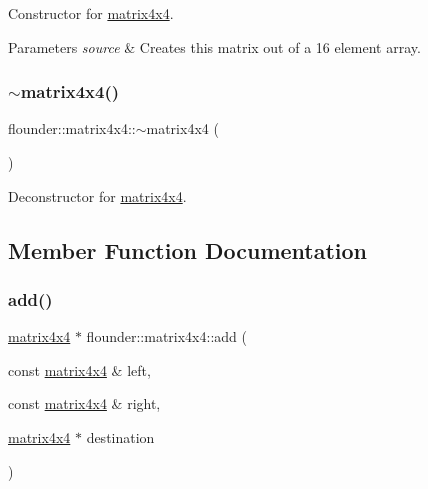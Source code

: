 Constructor for \hyperlink{classflounder_1_1matrix4x4}{matrix4x4}. 


\begin{DoxyParams}{Parameters}
{\em source} & Creates this matrix out of a 16 element array. \\
\hline
\end{DoxyParams}
\mbox{\label{classflounder_1_1matrix4x4_a0efd92bb3a9177fdd16609cdb122861e}} 
\subsubsection{\texorpdfstring{$\sim$matrix4x4()}{~matrix4x4()}}
{\footnotesize\ttfamily flounder\+::matrix4x4\+::$\sim$matrix4x4 (\begin{DoxyParamCaption}{ }\end{DoxyParamCaption})}



Deconstructor for \hyperlink{classflounder_1_1matrix4x4}{matrix4x4}. 



\subsection{Member Function Documentation}
\mbox{\label{classflounder_1_1matrix4x4_a9980ab4e5e8e974e84cb9d68fb6d2cde}} 
\subsubsection{\texorpdfstring{add()}{add()}}
{\footnotesize\ttfamily \hyperlink{classflounder_1_1matrix4x4}{matrix4x4} $\ast$ flounder\+::matrix4x4\+::add (\begin{DoxyParamCaption}\item[{const \hyperlink{classflounder_1_1matrix4x4}{matrix4x4} \&}]{left,  }\item[{const \hyperlink{classflounder_1_1matrix4x4}{matrix4x4} \&}]{right,  }\item[{\hyperlink{classflounder_1_1matrix4x4}{matrix4x4} $\ast$}]{destination }\end{DoxyParamCaption})\hspace{0.3cm}{\ttfamily [static]}}



